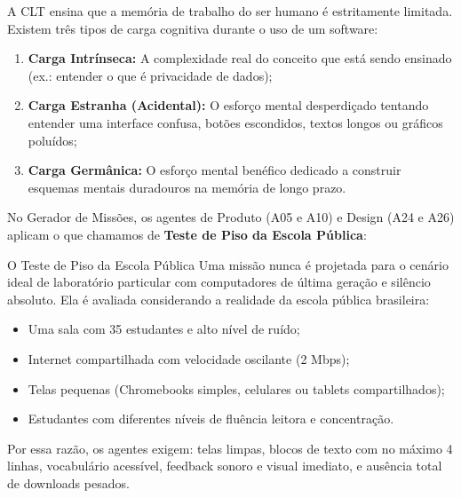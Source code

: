 \documentclass[11pt,a4paper]{article}
\begin{document}
A CLT ensina que a memória de trabalho do ser humano é estritamente limitada. Existem três tipos de carga cognitiva durante o uso de um software:
\begin{enumerate}
  \item \textbf{Carga Intrínseca:} A complexidade real do conceito que está sendo ensinado (ex.: entender o que é privacidade de dados);
  \item \textbf{Carga Estranha (Acidental):} O esforço mental desperdiçado tentando entender uma interface confusa, botões escondidos, textos longos ou gráficos poluídos;
  \item \textbf{Carga Germânica:} O esforço mental benéfico dedicado a construir esquemas mentais duradouros na memória de longo prazo.
\end{enumerate}

No Gerador de Missões, os agentes de Produto (A05 e A10) e Design (A24 e A26) aplicam o que chamamos de \textbf{Teste de Piso da Escola Pública}:
\begin{caixaConceito}{O Teste de Piso da Escola Pública}
Uma missão nunca é projetada para o cenário ideal de laboratório particular com computadores de última geração e silêncio absoluto. Ela é avaliada considerando a realidade da escola pública brasileira:
\begin{itemize}[noitemsep]
  \item Uma sala com 35 estudantes e alto nível de ruído;
  \item Internet compartilhada com velocidade oscilante (2 Mbps);
  \item Telas pequenas (Chromebooks simples, celulares ou tablets compartilhados);
  \item Estudantes com diferentes níveis de fluência leitora e concentração.
\end{itemize}
Por essa razão, os agentes exigem: telas limpas, blocos de texto com no máximo 4 linhas, vocabulário acessível, feedback sonoro e visual imediato, e ausência total de downloads pesados.
\end{caixaConceito}
\end{document}
